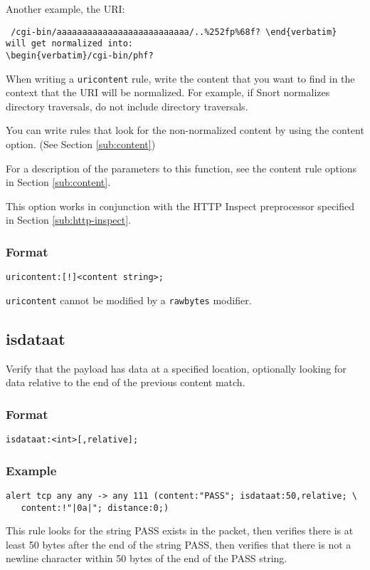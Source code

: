 \documentclass[english]{report}
\newenvironment{note}{
\samepage
    \vspace{10pt}{\textsf{
        {\hspace{7pt}\Huge{$\triangle$\hspace{-12.5pt}{\Large{$^!$}}}}\hspace{5pt}
        {\Large{NOTE}}
    }
    }
   \begin{center}
    \par\vspace{-17pt}

    \begin{lrbox}{\savepar}
    \begin{minipage}[r]{6in}
}
{
    \end{minipage}
    \end{lrbox}
    \fbox{
        \usebox{
            \savepar
	}
    }
    \par\vskip10pt
    \end{center}
}
\newenvironment{note}{
        \begin{rawhtml}
        <p><table border="1"><tr><td><b>
        Note:&nbsp;&nbsp;</b>
        \end{rawhtml}
}{
        \begin{rawhtml}
        </b></td></tr></table></p>
        \end{rawhtml}
}
\begin{document}
Another example, the URI:
\begin{verbatim} /cgi-bin/aaaaaaaaaaaaaaaaaaaaaaaaaa/..%252fp%68f? \end{verbatim}
will get normalized into:
\begin{verbatim}/cgi-bin/phf?\end{verbatim}

When writing a \texttt{uricontent} rule, write the content that you want to
find in the context that the URI will be normalized.  For example, if Snort
normalizes directory traversals, do not include directory traversals.  

You can write rules that look for the non-normalized content by using the
content option.  (See Section \ref{sub:content})

For a description of the parameters to this function, see the content rule
options in Section \ref{sub:content}. 

This option works in conjunction with the HTTP Inspect preprocessor specified
in Section \ref{sub:http-inspect}.

\subsubsection{Format}

\begin{verbatim}
uricontent:[!]<content string>;
\end{verbatim}

\begin{note}
\texttt{uricontent} cannot be modified by a \texttt{rawbytes} modifier.
\end{note}

\subsection{isdataat}

Verify that the payload has data at a specified location, optionally looking for data relative to the end of the previous content match.

\subsubsection{Format}

\begin{verbatim}
isdataat:<int>[,relative];
\end{verbatim}

\subsubsection{Example}
\begin{verbatim}
alert tcp any any -> any 111 (content:"PASS"; isdataat:50,relative; \ 
   content:!"|0a|"; distance:0;)
\end{verbatim}
This rule looks for the string PASS exists in the packet, then verifies there
is at least 50 bytes after the end of the string PASS, then verifies that there
is not a newline character within 50 bytes of the end of the PASS string.
\end{document}
